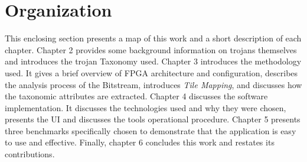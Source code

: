 \section{Organization}
This enclosing section presents a map of this work and a short description of each chapter.
Chapter 2 provides some background information on trojans themselves and introduces the trojan Taxonomy used.
Chapter 3 introduces the methodology used.
It gives a brief overview of \acrshort{FPGA} architecture and configuration, describes the analysis process of the \gls{Bitstream}, introduces \textit{Tile Mapping}, and discusses how the taxonomic attributes are extracted.
Chapter 4 discusses the software implementation.
It discusses the technologies used and why they were chosen, presents the \acrlong{UI} and discusses the tools operational procedure.
Chapter 5 presents three benchmarks specifically chosen to demonstrate that the application is easy to use and effective.
Finally, chapter 6 concludes this work and restates its contributions.